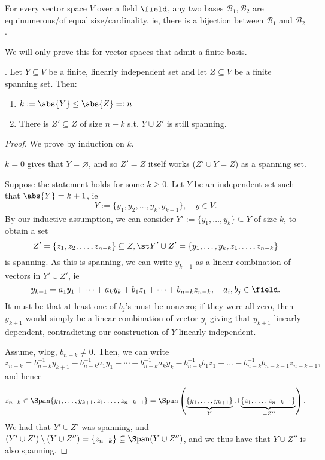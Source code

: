 \begin{theorem}\label{thm:basesofequalcardinality}
    For every vector space $V$ over a field $\field$, any two bases $\mathcal{B}_1,\mathcal{B}_2$ are equinumerous/of equal size/cardinality, ie, there is a bijection between $\mathcal{B}_1$ and $\mathcal{B}_2$.
\end{theorem}

\begin{remark}
    We will only prove this for vector spaces that admit a finite basis.
\end{remark}

\begin{lemma}\label{lemma:steinitz}
     . Let $Y \subseteq V$ be a finite, linearly independent set and let $Z \subseteq V$ be a finite spanning set. Then:
    \begin{enumerate}
        \item $k:=\abs{Y} \leq \abs{Z} =: n$
        \item There is $Z' \subseteq Z$ of size $n -k$ s.t. $Y \cup Z'$ is still spanning.
    \end{enumerate}
\end{lemma}

\begin{proof}
    We prove by induction on $k$.

    $k = 0$ gives that $Y = \varnothing$, and so $Z' = Z$ itself works ($Z' \cup Y = Z$) as a spanning set.

    Suppose the statement holds for some $k \geq 0$. Let $Y$ be an independent set such that $\abs{Y} = k + 1$, ie \[
    Y := \{y_1, y_2, \dots, y_k, y_{k+1}\}, \quad y \in V.
    \]
    By our inductive assumption, we can consider $Y' := \{y_1, \dots, y_k\} \subseteq Y$ of size $k$, to obtain a set \[
    Z' = \{z_1, z_2, \dots, z_{n-k}\} \subseteq Z, \st Y' \cup Z' = \{y_1, \dots, y_k, z_1, \dots, z_{n-k}\}
    \]
    is spanning. As this is spanning, we can write $y_{k+1}$ as a linear combination of vectors in $Y' \cup Z'$, ie \[
    y_{k+1} = a_1 y_1 + \dots + a_k y_k + b_1 z_1 + \dots + b_{n-k} z_{n-k}, \quad a_i, b_j \in \field.
    \]
    It must be that at least one of $b_j$'s must be nonzero; if they were all zero, then $y_{k+1}$ would simply be a linear combination of vector $y_i$ giving that $y_{k+1}$ linearly dependent, contradicting our construction of $Y$ linearly independent.

    Assume, wlog, $b_{n-k} \neq 0$. Then, we can write \[
    z_{n-k} = b_{n-k}^{-1}y_{k+1}-b_{n-k}^{-1}a_1y_{1}-\cdots - b_{n-k}^{-1}a_ky_k - b_{n-k}^{-1}b_1 z_1 - \dots - b_{n-k}^{-1}b_{n-k-1}z_{n-k-1},    
    \]
    and hence $$z_{n-k} \in \Span \{y_1, \dots, y_{k+1}, z_1, \dots, z_{n-k-1}\} = \Span \left(\underbrace{\{y_1, \dots, y_{k+1}\}}_{Y} \cup \underbrace{\{z_1, \dots, z_{n-k-1}\}}_{:= Z''} \right).$$
    We had that $Y' \cup Z'$ was spanning, and $(Y' \cup Z') \setminus (Y \cup Z'') = \{z_{n-k}\} \subseteq \Span (Y \cup Z'')$, and we thus have that $Y \cup Z''$ is also spanning.
\end{proof}


